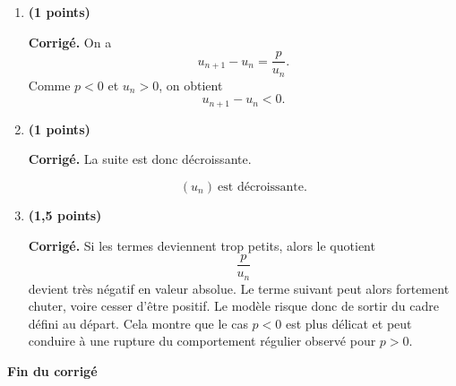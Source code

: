 \documentclass[11pt,a4paper]{article}
\newcommand{\bareme}[1]{\hfill{\color{blue!70!black}\textbf{(#1 points)}}}
\newcommand{\corr}{\noindent\textcolor{blue!70!black}{\textbf{Corrigé. }}}
\begin{document}
\begin{enumerate}[label=\textbf{E.\arabic*.}, leftmargin=0.9cm]

\item \bareme{1}

\corr On a
\[
u_{n+1}-u_n=\frac{p}{u_n}.
\]
Comme $p<0$ et $u_n>0$, on obtient
\[
\boxed{u_{n+1}-u_n<0.}
\]

\item \bareme{1}

\corr La suite est donc décroissante.

\[
\boxed{(u_n)\ \text{est décroissante}.}
\]

\item \bareme{1,5}

\corr Si les termes deviennent trop petits, alors le quotient
\[
\frac{p}{u_n}
\]
devient très négatif en valeur absolue. Le terme suivant peut alors fortement chuter, voire cesser d’être positif. Le modèle risque donc de sortir du cadre défini au départ. Cela montre que le cas $p<0$ est plus délicat et peut conduire à une rupture du comportement régulier observé pour $p>0$.

\end{enumerate}

\vfill

\begin{center}
    \textbf{Fin du corrigé}
\end{center}
\end{document}
